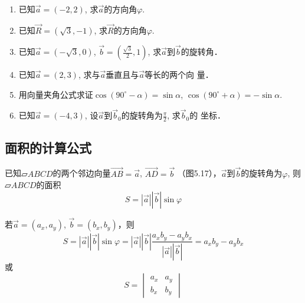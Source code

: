 \begin{ex}
\begin{enumerate}
    \item 已知$\vec{a}=(-2,2)$, 求$\vec{a}$的方向角$\varphi$.
    \item 已知$\vec{R}=(\sqrt{3},-1)$, 求$\vec{R}$的方向角$\varphi$.
    
    \item 已知$\vec{a}=(-\sqrt{3},0)$, $\vec{b}=\left(\frac{\sqrt{3}}{2},1\right)$, 
    求$\vec{a}$到$\vec{b}$的旋转角．
    \item 已知$\vec{a}=(2,3)$, 求与$\vec{a}$垂直且与$\vec{a}$等长的两个向
    量．
    \item 用向量夹角公式求证$\cos(90^{\circ}-\alpha)=\sin\alpha$, $\cos(90^{\circ}+\alpha)=-\sin\alpha$.
    \item 已知$\vec{a}=(-4,3)$, 设$\vec{a}$到$\vec{b}_0$的旋转角为$\frac{\pi}{2}$,  求$\vec{b}_0$的
    坐标．
\end{enumerate}
\end{ex}

\subsection{面积的计算公式}
已知$\parallelogram{ABCD}$的两个邻边向量$\Vec{AB}=\vec{a}$, $\Vec{AD}=\vec{b}$
（图5.17），$\vec{a}$到$\vec{b}$的旋转角为$\varphi$, 则$\parallelogram{ABCD}$的面积
\[S=|\vec{a}|\left|\vec{b}\right|\sin\varphi\]

\begin{figure}[htp]
    \centering
{}
    \caption{}
\end{figure}


若$\vec{a}=(a_x,a_y)$, $\vec{b}=(b_x,b_y)$，则
\[S=|\vec{a}|\left|\vec{b}\right|\sin\varphi=|\vec{a}|\left|\vec{b}\right|\frac{a_xb_y-a_yb_x}{|\vec{a}|\left|\vec{b}\right|}=a_xb_y-a_yb_x\]
或
\begin{equation}
    S=\begin{vmatrix}
        a_x&a_y\\b_x&b_y
    \end{vmatrix}
\end{equation}

